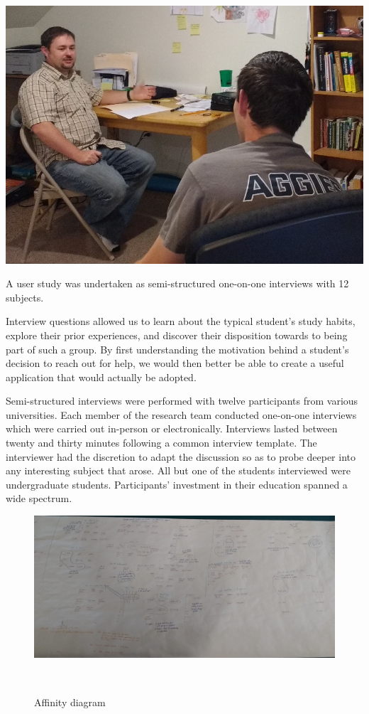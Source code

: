 \documentclass{sigchi-ext}
\begin{document}
\begin{marginfigure}[-10pc]
  \begin{minipage}{\marginparwidth}
    \centering
    \includegraphics[width=0.9\marginparwidth]{figures/user_study.jpg}
	\caption{A user study was undertaken as semi-structured one-on-one
	  interviews with 12 subjects.}
  \end{minipage}
\end{marginfigure}



Interview questions allowed us to learn about the typical student's study
habits, explore their prior experiences, and discover their disposition towards
to being part of such a group. By first understanding the motivation behind a
student's decision to reach out for help, we would then better be able to
create a useful application that would actually be adopted.

Semi-structured interviews were performed with twelve participants from various
universities.  Each member of the research team conducted one-on-one interviews
which were carried out in-person or electronically.  Interviews lasted between
twenty and thirty minutes following a common interview template. The
interviewer had the discretion to adapt the discussion so as to probe deeper
into any interesting subject that arose.  All but one of the students
interviewed were undergraduate students.  Participants' investment in their
education spanned a wide spectrum.


\begin{figure}
  \includegraphics[width=0.9\columnwidth]{figures/affinity_diagram.jpg}
  \caption{Affinity diagram}~\label{fig:sample}
\end{figure}
\end{document}
